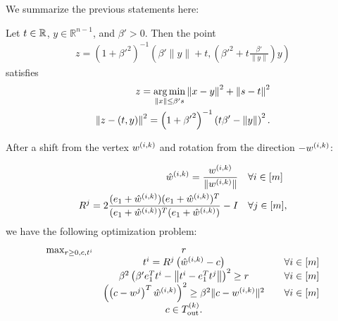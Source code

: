 
We summarize the previous statements here:
\begin{lemma}
Let $t \in \mathbb R$, $y \in \mathbb R^{n-1}$, and $\beta' > 0$.
Then the point
\begin{align*}
z = \left(1 + {\beta'} ^ 2\right)^{-1} \left({\beta'} \|y\| + t, \left({\beta'} ^ 2 + t \frac {{\beta'}}{\|y\|}\right) y\right)
\end{align*}
satisfies
\begin{align*}
z = \operatorname*{arg\,min}_{\left\|x\right\| \le \beta' s} \left\|x - y\right\|^2 + \left\|s - t\right\|^2 \\
\left\|z - (t, y)\right\|^2 = \left(1 + {\beta'}^2\right)^{-1}\left(t \beta' - \left\|y\right\| \right)^2.
\end{align*}
\end{lemma}

After a shift from the vertex ${w^{(i, k)}}$ and rotation from the direction $-{w^{(i, k)}}$:

\begin{align*}
\hat w^{(i,k)} = \frac {{w^{(i, k)}}} {\|{w^{(i, k)}}\|} & \quad \forall i \in [m] \\
R^j = 2 \frac{(e_1 + \hat w^{(i,k)})(e_1 + \hat w^{(i,k)})^T}{(e_1 + \hat w^{(i,k)})^T(e_1 + \hat w^{(i,k)})} - I  & \quad \forall j \in [m],
\end{align*}
we have the following optimization problem:
\begin{align*}
\begin{array} {ccc}
\max_{r \ge 0, c, t^i}	& r & \\
					& t^i = R^j\left(\hat w^{(i,k)} - c\right) 									& \quad \forall i \in [m] \\
					& \beta^2 \left(\beta' e_1^T t^i - \left\|t^i - e_1^T t^j\right\|\right)^2 \ge r			& \quad \forall i \in [m] \\
					& \left(\left(c - w^j\right)^T\hat w^{(i,k)}\right)^2 \ge \beta^2 \|c - {w^{(i, k)}}\|^2		& \quad \forall i \in [m] \\
					& c \in {T_{\text{out}}^{(k)}}. &
\end{array}
\end{align*}


